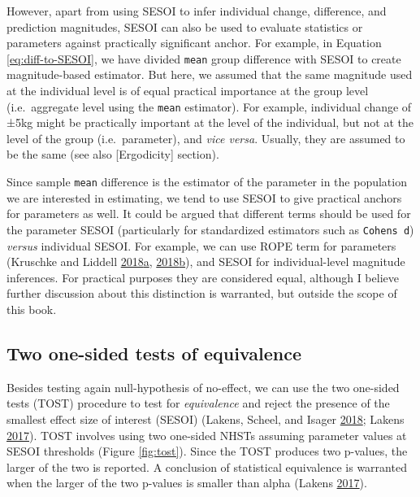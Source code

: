 \documentclass[
]{book}
\begin{document}
However, apart from using SESOI to infer individual change, difference, and prediction magnitudes, SESOI can also be used to evaluate statistics or parameters against practically significant anchor. For example, in Equation \eqref{eq:diff-to-SESOI}, we have divided \texttt{mean} group difference with SESOI to create magnitude-based estimator. But here, we assumed that the same magnitude used at the individual level is of equal practical importance at the group level (i.e.~aggregate level using the \texttt{mean} estimator). For example, individual change of ±5kg might be practically important at the level of the individual, but not at the level of the group (i.e.~parameter), and \emph{vice versa}. Usually, they are assumed to be the same (see also {[}Ergodicity{]} section).

Since sample \texttt{mean} difference is the estimator of the parameter in the population we are interested in estimating, we tend to use SESOI to give practical anchors for parameters as well. It could be argued that different terms should be used for the parameter SESOI (particularly for standardized estimators such as \texttt{Cohen\textquotesingle{}s\ d}) \emph{versus} individual SESOI. For example, we can use ROPE term for parameters (Kruschke and Liddell \protect\hyperlink{ref-kruschkeBayesianDataAnalysis2018}{2018}\protect\hyperlink{ref-kruschkeBayesianDataAnalysis2018}{a}, \protect\hyperlink{ref-kruschkeBayesianNewStatistics2018}{2018}\protect\hyperlink{ref-kruschkeBayesianNewStatistics2018}{b}), and SESOI for individual-level magnitude inferences. For practical purposes they are considered equal, although I believe further discussion about this distinction is warranted, but outside the scope of this book.

\hypertarget{two-one-sided-tests-of-equivalence}{%
\subsection{Two one-sided tests of equivalence}\label{two-one-sided-tests-of-equivalence}}

Besides testing again null-hypothesis of no-effect, we can use the two one-sided tests (TOST) procedure to test for \emph{equivalence} and reject the presence of the smallest effect size of interest (SESOI) (Lakens, Scheel, and Isager \protect\hyperlink{ref-lakensEquivalenceTestingPsychological2018}{2018}; Lakens \protect\hyperlink{ref-lakensEquivalenceTestsPractical2017}{2017}). TOST involves using two one-sided NHSTs assuming parameter values at SESOI thresholds (Figure \ref{fig:tost}). Since the TOST produces two p-values, the larger of the two is reported. A conclusion of statistical equivalence is warranted when the larger of the two p-values is smaller than alpha (Lakens \protect\hyperlink{ref-lakensEquivalenceTestsPractical2017}{2017}).
\end{document}
